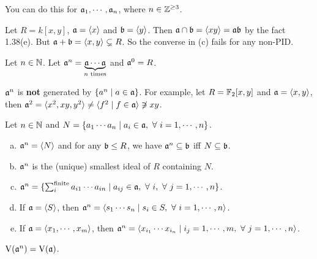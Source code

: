 \begin{remark}
    You can do this for $\mathfrak{a}_1,\cdots,\mathfrak{a}_n$, where $n \in \mathbb{Z}^{\geq 3}$.
\end{remark}

\begin{example}
    Let $R = k[x,y]$, $\mathfrak{a} = \langle x \rangle$ and $\mathfrak{b} = \langle y \rangle$. Then $\mathfrak{a} \cap \mathfrak{b} = \langle xy \rangle = \mathfrak{a} \mathfrak{b}$ by the fact 1.38(e). But $\mathfrak{a} + \mathfrak{b} = \langle x,y \rangle \subsetneq R$. So the converse in (c) fails for any non-PID.
\end{example}

\begin{definition}
    Let $n \in \mathbb{N}$. Let $\mathfrak{a}^n = \underbrace{\mathfrak{a} \cdots \mathfrak{a}}_{n\text{ times}}$ and $\mathfrak{a}^0 = R$.
\end{definition}

\begin{warning}
    $\mathfrak{a}^n$ is \textbf{not} generated by $\{a^n \mid a \in \mathfrak{a}\}$. For example, let $R = \mathbb{F}_2[x,y]$ and $\mathfrak{a} = \langle x,y \rangle$, then $\mathfrak{a}^2 = \langle x^2,xy,y^2 \rangle \neq \langle f^2 \mid f \in \mathfrak{a} \rangle \not \ni xy$.
\end{warning}

\begin{fact}
    Let $n \in \mathbb{N}$ and $N = \{a_1 \cdots a_n \mid a_i \in \mathfrak{a},\ \forall \  i = 1,\cdots,n\}$.
    \begin{enumerate}[(a)]
        \item
            $\mathfrak{a}^n = \langle N \rangle$ and for any $\mathfrak{b} \leq R$, we have $\mathfrak{a}^n \subseteq \mathfrak{b}$ iff $N \subseteq \mathfrak{b}$.
        \item 
            $\mathfrak{a}^n$ is the (unique) smallest ideal of $R$ containing $N$.
        \item $\mathfrak{a}^n = \{\sum_{i}^{\text{finite}}a_{i1} \cdots a_{in} \mid a_{ij} \in \mathfrak{a}, \ \forall \  i,\ \forall \  j = 1,\cdots,n\}$.
        \item If $\mathfrak{a} = \langle S \rangle$, then $\mathfrak{a}^n = \langle s_1 \cdots s_n \mid s_i \in S,\ \forall \  i = 1,\cdots,n\rangle$.
        \item 
            If $\mathfrak{a} = \langle x_1,\cdots,x_m \rangle$, then $\mathfrak{a}^n = \langle x_{i_1} \cdots x_{i_n} \mid i_j = 1,\cdots,m,\ \forall \  j = 1,\cdots,n \rangle$.
    \end{enumerate}
\end{fact}

\begin{fact}
    $\operatorname{V}(\mathfrak{a}^n) = \operatorname{V}(\mathfrak{a})$.
\end{fact}

